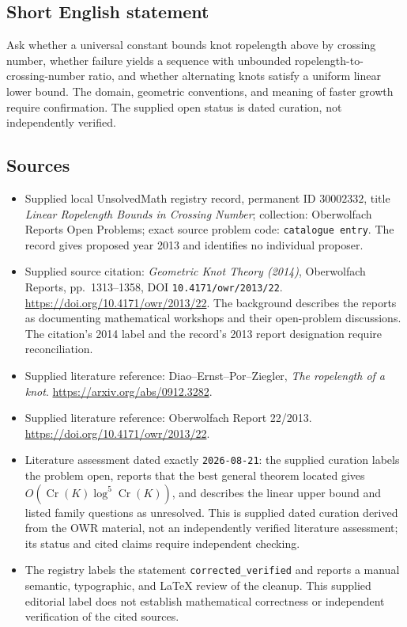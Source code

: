 \documentclass[11pt]{article}
\begin{document}
\subsection{Short English statement}
Ask whether a universal constant bounds knot ropelength above by crossing number, whether failure yields a sequence with unbounded ropelength-to-crossing-number ratio, and whether alternating knots satisfy a uniform linear lower bound. The domain, geometric conventions, and meaning of faster growth require confirmation. The supplied open status is dated curation, not independently verified.
\subsection{Sources}
\begin{itemize}
\item Supplied local UnsolvedMath registry record, permanent ID \(30002332\), title \emph{Linear Ropelength Bounds in Crossing Number}; collection: Oberwolfach Reports Open Problems; exact source problem code: \texttt{catalogue entry}. The record gives proposed year 2013 and identifies no individual proposer.
\item Supplied source citation: \emph{Geometric Knot Theory (2014)}, Oberwolfach Reports, pp.~1313--1358, DOI \texttt{10.4171/owr/2013/22}. \url{https://doi.org/10.4171/owr/2013/22}. The background describes the reports as documenting mathematical workshops and their open-problem discussions. The citation's 2014 label and the record's 2013 report designation require reconciliation.
\item Supplied literature reference: Diao--Ernst--Por--Ziegler, \emph{The ropelength of a knot}. \url{https://arxiv.org/abs/0912.3282}.
\item Supplied literature reference: Oberwolfach Report 22/2013. \url{https://doi.org/10.4171/owr/2013/22}.
\item Literature assessment dated exactly \texttt{2026-08-21}: the supplied curation labels the problem open, reports that the best general theorem located gives \(O(\operatorname{Cr}(K)\log^5\operatorname{Cr}(K))\), and describes the linear upper bound and listed family questions as unresolved. This is supplied dated curation derived from the OWR material, not an independently verified literature assessment; its status and cited claims require independent checking.
\item The registry labels the statement \texttt{corrected\_verified} and reports a manual semantic, typographic, and LaTeX review of the cleanup. This supplied editorial label does not establish mathematical correctness or independent verification of the cited sources.
\end{itemize}
\end{document}
